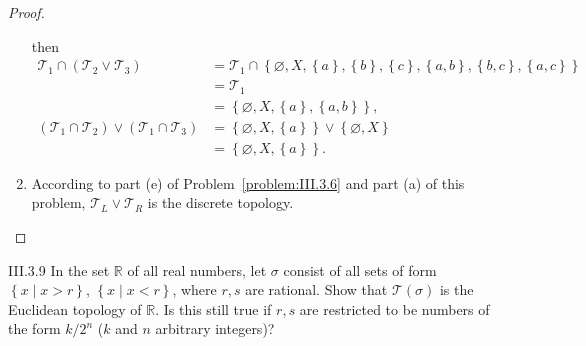 \begin{proof}
\begin{enumerate}[label={(\alph*)}]
              then
              \begingroup
              \allowdisplaybreaks%
              \begin{align*}
                  \mathscr{T}_{1} \cap (\mathscr{T}_{2} \vee \mathscr{T}_{3})                        & = \mathscr{T}_{1} \cap \left\{ \varnothing, X, \left\{ a \right\}, \left\{ b \right\}, \left\{ c \right\}, \left\{ a, b \right\}, \left\{ b, c \right\}, \left\{ a, c \right\} \right\} \\
                                                                                                     & = \mathscr{T}_{1}                                                                                                                                                                       \\
                                                                                                     & = \left\{ \varnothing, X, \left\{ a \right\}, \left\{ a, b \right\} \right\},                                                                                                           \\
                  (\mathscr{T}_{1} \cap \mathscr{T}_{2}) \vee (\mathscr{T}_{1} \cap \mathscr{T}_{3}) & = \left\{ \varnothing, X, \left\{ a \right\} \right\} \vee \left\{ \varnothing, X \right\}                                                                                              \\
                                                                                                     & = \left\{ \varnothing, X, \left\{ a \right\} \right\}.
              \end{align*}
              \endgroup
        \item According to part (e) of Problem~\ref{problem:III.3.6} and part (a) of this problem, \( \mathscr{T}_{L} \vee \mathscr{T}_{R} \) is the discrete topology.
    \end{enumerate}
\end{proof}

\begin{problem}{III.3.9}
In the set \(\mathbb{R}\) of all real numbers, let \( \sigma \) consist of all sets of form \( \left\{ x \mid x > r \right\} \), \( \left\{ x \mid x < r \right\} \), where \( r, s \) are rational. Show that \( \mathscr{T}(\sigma) \) is the Euclidean topology of \( \mathbb{R} \). Is this still true if \( r, s \) are restricted to be numbers of the form \( k/2^{n} \) (\(k\) and \(n\) arbitrary {\color{red}integers})?
\end{problem}

